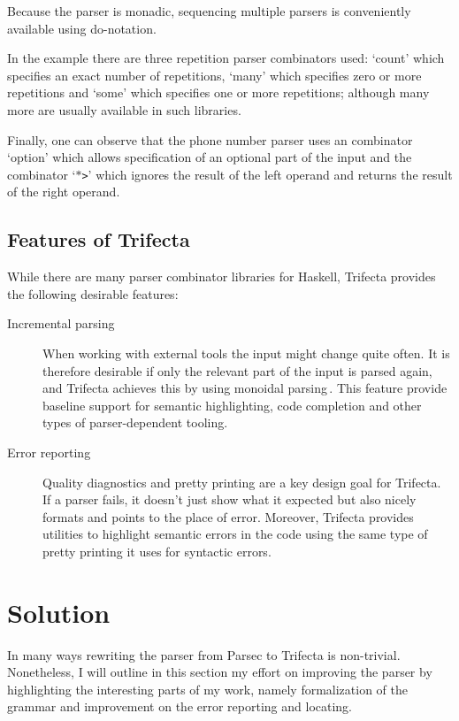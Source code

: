 \documentclass[a4paper]{article}%
\begin{document}
Because the parser is monadic, sequencing multiple parsers is conveniently available using do-notation.

In the example there are three repetition parser combinators used: `count' which specifies an exact number of repetitions, `many' which specifies zero or more repetitions and `some' which specifies one or more repetitions;
although many more are usually available in such libraries.

Finally, one can observe that the phone number parser uses an combinator `option' which allows specification of an optional part of the input and the combinator `\texttt{$\ast$>}' which ignores the result of the left operand and returns
the result of the right operand.

\subsection{Features of Trifecta}
\label{sub:FeaturesofTrifecta}
While there are many parser combinator libraries for Haskell, Trifecta provides the following desirable features:
\begin{description}
  \item[Incremental parsing] When working with external tools the input might change quite often.
                             It is therefore desirable if only the relevant part of the input is parsed again, and Trifecta achieves this by using monoidal parsing\,\cite{kmett2009iteratorsparsecandmonoids}.
                             This feature provide baseline support for semantic highlighting, code completion and other types of parser-dependent tooling.
  \item[Error reporting] Quality diagnostics and pretty printing are a key design goal for Trifecta. If a parser fails, it doesn't just show what it expected but also nicely formats and points to the place of error. 
                         Moreover, Trifecta provides utilities to highlight semantic errors in the code using the same type of pretty printing it uses for syntactic errors.
\end{description}

\section{Solution}
\label{sec:Solution}
In many ways rewriting the parser from Parsec to Trifecta is non-trivial.
Nonetheless, I will outline in this section my effort on improving the parser by highlighting the interesting parts of my work, namely formalization of the grammar and improvement on the error reporting and locating.
\end{document}
